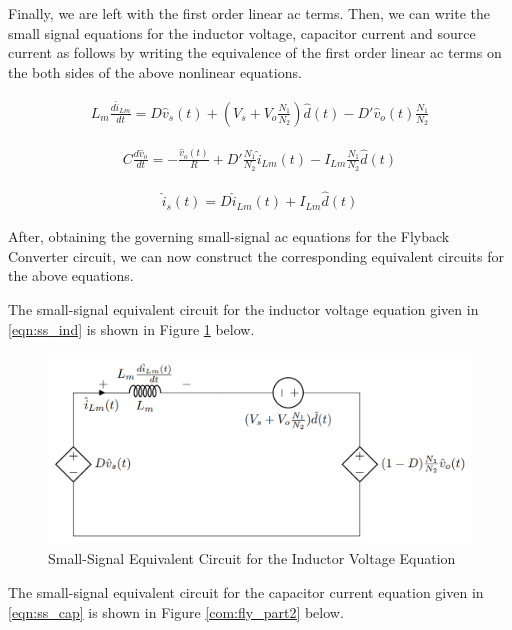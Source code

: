 Finally, we are left with the first order linear ac terms. Then, we can write the small signal equations for the inductor voltage, capacitor current and source current as follows by writing the equivalence of the first order linear ac terms on the both sides of the above nonlinear equations.

\begin{align}
    L_m\frac{d\hat{i}_{Lm}}{dt} = D\hat{v}_s(t) + (V_s+V_o\frac{N_1}{N_2})\hat{d}(t) - D'\hat{v}_o(t)\frac{N_1}{N_2}
    \label{eqn:ss_ind}
\end{align}

\begin{align}
    C\frac{d\hat{v}_o}{dt} = -\frac{\hat{v}_o(t)}{R} + D'\frac{N_1}{N_2}\hat{i}_{Lm}(t) - I_{Lm}\frac{N_1}{N_2}\hat{d}(t)
    \label{eqn:ss_cap}
\end{align}

\begin{align}
    \hat{i}_s(t) = D\hat{i}_{Lm}(t) + I_{Lm}\hat{d}(t)
    \label{eqn:ss_source}
\end{align}

After, obtaining the governing small-signal ac equations for the Flyback Converter circuit, we can now construct the corresponding equivalent circuits for the above equations.

The small-signal equivalent circuit for the inductor voltage equation given in \eqref{eqn:ss_ind} is shown in Figure \ref{com:fly_part1} below.

\begin{figure}[H]
\begin{center}
\includegraphics[width=1\textwidth]{Compensator/flyback_part1.png}
\caption{Small-Signal Equivalent Circuit for the Inductor Voltage Equation}
\label{com:fly_part1}
\end{center}
\end{figure}

The small-signal equivalent circuit for the capacitor current equation given in \eqref{eqn:ss_cap} is shown in Figure \ref{com:fly_part2} below.

